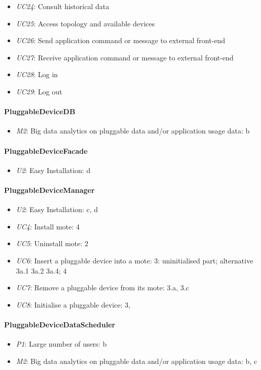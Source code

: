 \begin{itemize}
            \item \emph{UC24}: Consult historical data
            \item \emph{UC25}: Access topology and available devices
            \item \emph{UC26}: Send application command or message to external front-end
            \item \emph{UC27}: Receive application command or message to external front-end
            \item \emph{UC28}: Log in
            \item \emph{UC29}: Log out
        \end{itemize}

    \paragraph{PluggableDeviceDB}
        \begin{itemize}
            \item \emph{M2}: Big data analytics on pluggable data and/or application usage data: b
        \end{itemize}

    \paragraph{PluggableDeviceFacade}
        \begin{itemize}
        	\item \emph{U2}: Easy Installation: d
        \end{itemize}

    \paragraph{PluggableDeviceManager}
        \begin{itemize}
            \item \emph{U2}: Easy Installation: c, d
            \item \emph{UC4}: Install mote: 4
            \item \emph{UC5}: Uninstall mote: 2
            \item \emph{UC6}: Insert a pluggable device into a mote: 3: uninitialised part; alternative 3a.1 3a.2 3a.4; 4
            \item \emph{UC7}: Remove a pluggable device from its mote: 3.a, 3.c
            \item \emph{UC8}: Initialise a pluggable device: 3,
        \end{itemize}

    \paragraph{PluggableDeviceDataScheduler}
        \begin{itemize}
            \item \emph{P1}: Large number of users: b
            \item \emph{M2}: Big data analytics on pluggable data and/or application usage data: b, c
        \end{itemize} 
